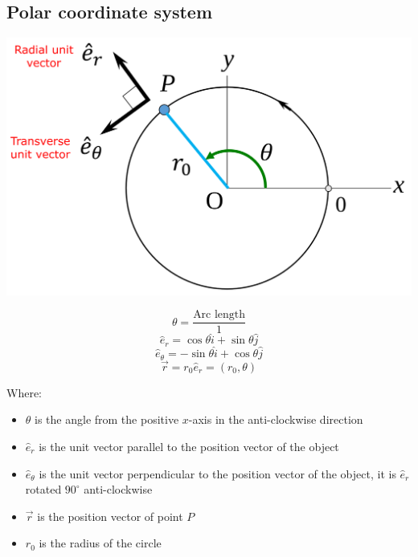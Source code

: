 \documentclass[11pt]{article}
\begin{document}
\subsection{Polar coordinate system}
\label{sec:orge9934fc}
\begin{center}
\includegraphics[width=.9\linewidth]{./images/polar-coordinates.png}
\end{center}
\[\theta = \frac{\text{Arc length}}{1}\]
\[\hat{e}_r = \cos \theta \hat{i} + \sin \theta \hat{j}\]
\[\hat{e}_{\theta} = - \sin \theta \hat{i} + \cos \theta \hat{j}\]
\[\vec{r} = r_0 \hat{e}_r = (r_0, \theta)\]

Where:
\begin{itemize}
\item \(\theta\) is the angle from the positive \(x\)-axis in the anti-clockwise direction
\item \(\hat{e}_r\) is the unit vector parallel to the position vector of the object
\item \(\hat{e}_{\theta}\) is the unit vector perpendicular to the position vector of the object, it is \(\hat{e}_r\) rotated \(90^{\circ}\) anti-clockwise
\item \(\vec{r}\) is the position vector of point \(P\)
\item \(r_0\) is the radius of the circle
\end{itemize}
\end{document}
